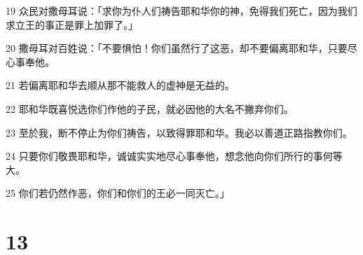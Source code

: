 \par 19 众民对撒母耳说：「求你为仆人们祷告耶和华你的神，免得我们死亡，因为我们求立王的事正是罪上加罪了。」
\par 20 撒母耳对百姓说：「不要惧怕！你们虽然行了这恶，却不要偏离耶和华，只要尽心事奉他。
\par 21 若偏离耶和华去顺从那不能救人的虚神是无益的。
\par 22 耶和华既喜悦选你们作他的子民，就必因他的大名不撇弃你们。
\par 23 至於我，断不停止为你们祷告，以致得罪耶和华。我必以善道正路指教你们。
\par 24 只要你们敬畏耶和华，诚诚实实地尽心事奉他，想念他向你们所行的事何等大。
\par 25 你们若仍然作恶，你们和你们的王必一同灭亡。」

\chapter{13}

